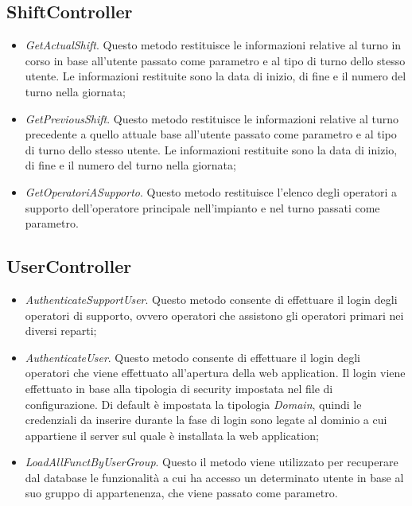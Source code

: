   \subsection{ShiftController}
  \begin{itemize}
    \item \textit{GetActualShift}. Questo metodo restituisce le informazioni relative al turno in corso in base
    all'utente passato come parametro e al tipo di turno dello stesso utente. Le informazioni restituite sono
    la data di inizio, di fine e il numero del turno nella giornata;
    \item \textit{GetPreviousShift}. Questo metodo restituisce le informazioni relative al turno precedente a
    quello attuale base all'utente passato come parametro e al tipo di turno dello stesso utente. Le informazioni
    restituite sono la data di inizio, di fine e il numero del turno nella giornata;
    \item \textit{GetOperatoriASupporto}. Questo metodo restituisce l'elenco degli operatori a supporto dell'operatore
    principale nell'impianto e nel turno passati come parametro.
  \end{itemize}

  \subsection{UserController}
  \begin{itemize}
    \item \textit{AuthenticateSupportUser}. Questo metodo consente di effettuare il login degli operatori di supporto,
    ovvero operatori che assistono gli operatori primari nei diversi reparti;
    \item \textit{AuthenticateUser}. Questo metodo consente di effettuare il login degli operatori che viene effettuato
    all'apertura della web application. Il login viene effettuato in base alla tipologia di security impostata nel
    file di configurazione. Di default è impostata la tipologia \textit{Domain}, quindi le credenziali da inserire
    durante la fase di login sono legate al dominio a cui appartiene il server sul quale è installata la web application;
    \item \textit{LoadAllFunctByUserGroup}. Questo il metodo viene utilizzato per recuperare dal database le funzionalità
    a cui ha accesso un determinato utente in base al suo gruppo di appartenenza, che viene passato come parametro.    
  \end{itemize}